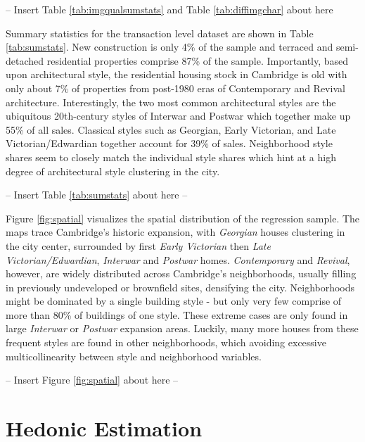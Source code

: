 \documentclass[]{article}
\begin{document}
\begin{center}
  -- Insert Table \ref{tab:imgqualsumstats} and Table \ref{tab:diffimgchar} about here
\end{center}

Summary statistics for the transaction level dataset are shown in Table \ref{tab:sumstats}.  New construction is only 4\% of the sample and terraced and semi-detached residential properties comprise 87\% of the sample. Importantly, based upon architectural style, the residential housing stock in Cambridge is old with only about 7\% of properties from post-1980 eras of Contemporary and Revival architecture. Interestingly, the two most common architectural styles are the ubiquitous 20th-century styles of Interwar and Postwar which together make up 55\% of all sales. Classical styles such as Georgian, Early Victorian, and Late Victorian/Edwardian together account for 39\% of sales. Neighborhood style shares seem to closely match the individual style shares which hint at a high degree of architectural style clustering in the city.

\begin{center}
  -- Insert Table \ref{tab:sumstats} about here --
\end{center}

Figure \ref{fig:spatial} visualizes the spatial distribution of the regression sample. The maps trace Cambridge's historic expansion, with \emph{Georgian} houses clustering in the city center, surrounded by first \emph{Early Victorian} then \emph{Late Victorian/Edwardian}, \emph{Interwar} and \emph{Postwar} homes.  \emph{Contemporary} and \emph{Revival}, however, are widely distributed across Cambridge's neighborhoods, usually filling in previously undeveloped or brownfield sites, densifying the city. Neighborhoods might be dominated by a single building style - but only very few comprise of more than 80\% of buildings of one style. These extreme cases are only found in large \emph{Interwar} or \emph{Postwar} expansion areas. Luckily, many more houses from these frequent styles are found in other neighborhoods, which avoiding excessive multicollinearity between style and neighborhood variables. 

\begin{center}
  -- Insert Figure \ref{fig:spatial} about here --
\end{center}




\hypertarget{results}{%
\section{Hedonic Estimation}\label{results}}
\end{document}
